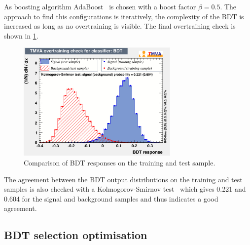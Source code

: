As boosting algorithm AdaBoost~\cite{AdaBoost} is chosen with a boost factor $\beta=0.5$.
The approach to find this configurations is iteratively, \ie the complexity of the \ac{BDT} is increased as long as no overtraining is visible.
The final overtraining check is shown in \cref{fig:BDTOVertraining}.
\begin{figure}[tbp]
    \centering
    \includegraphics[width=0.7\textwidth]{06selection/figs/overtrain_BDT.pdf}
    \caption{Comparison of \ac{BDT} responses on the training and test sample.}
    \label{fig:BDTOVertraining}
\end{figure}
The agreement between the \ac{BDT} output distributions on the training and test samples is also checked with a Kolmogorov-Smirnov test~\cite{Bohm:389738} which gives \num{0.221} and \num{0.604} for the signal and background samples and thus indicates a good agreement.

\subsection{BDT selection optimisation}
\label{sec:BDTOpt}

